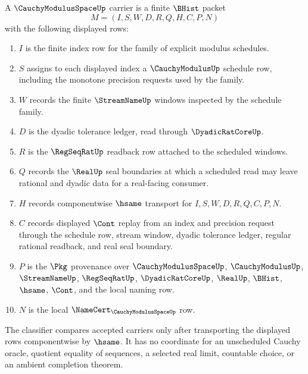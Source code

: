 \begin{definition}
\label{def:cauchy-modulus-space-carrier}
A $\CauchyModulusSpaceUp$ carrier is a finite $\BHist$ packet
$$
M=(I,S,W,D,R,Q,H,C,P,N)
$$
with the following displayed rows:
\begin{enumerate}
\item $I$ is the finite index row for the family of explicit modulus schedules.
\item $S$ assigns to each displayed index a $\CauchyModulusUp$ schedule row,
including the monotone precision requests used by the family.
\item $W$ records the finite $\StreamNameUp$ windows inspected by the schedule
family.
\item $D$ is the dyadic tolerance ledger, read through $\DyadicRatCoreUp$.
\item $R$ is the $\RegSeqRatUp$ readback row attached to the scheduled windows.
\item $Q$ records the $\RealUp$ seal boundaries at which a scheduled read may
leave rational and dyadic data for a real-facing consumer.
\item $H$ records componentwise $\hsame$ transport for $I,S,W,D,R,Q,C,P,N$.
\item $C$ records displayed $\Cont$ replay from an index and precision request
through the schedule row, stream window, dyadic tolerance ledger, regular
rational readback, and real seal boundary.
\item $P$ is the $\Pkg$ provenance over $\CauchyModulusSpaceUp$,
$\CauchyModulusUp$, $\StreamNameUp$, $\RegSeqRatUp$, $\DyadicRatCoreUp$,
$\RealUp$, $\BHist$, $\hsame$, $\Cont$, and the local naming row.
\item $N$ is the local $\NameCert_{\CauchyModulusSpaceUp}$ row.
\end{enumerate}
The classifier compares accepted carriers only after transporting the displayed
rows componentwise by $\hsame$. It has no coordinate for an unscheduled Cauchy
oracle, quotient equality of sequences, a selected real limit, countable choice,
or an ambient completion theorem.
\end{definition}

